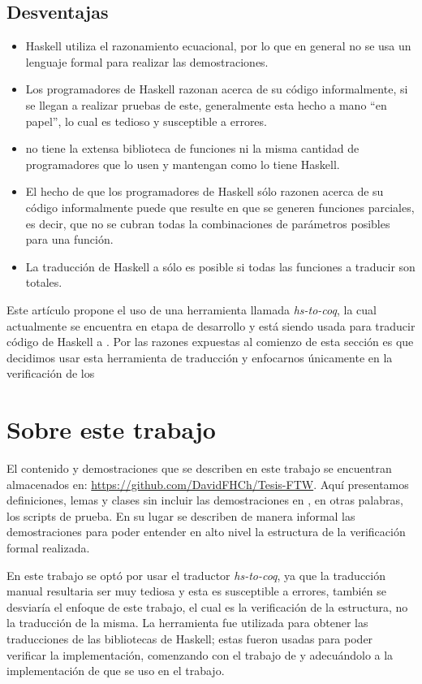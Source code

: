 \subsection{Desventajas}
\begin{itemize}
    \item Haskell utiliza el razonamiento ecuacional, por lo que en general no se usa un lenguaje formal para realizar las demostraciones.
    \item Los programadores de Haskell razonan acerca de su código informalmente, si se llegan a
    realizar pruebas de este, generalmente esta hecho a mano ``en papel'', lo cual es tedioso y
    susceptible a errores.
    \item {\coq} no tiene la extensa biblioteca de funciones ni la misma cantidad de programadores
    que lo usen y mantengan como lo tiene Haskell.
    \item El hecho de que los programadores de Haskell s\'olo razonen acerca de su código
    informalmente puede que resulte en que se generen funciones parciales, es decir, que no se
    cubran todas la combinaciones de parámetros posibles para una funci\'on.
    \item La traducci\'on de Haskell a {\coq} s\'olo es posible si todas las funciones a traducir son
    totales.
\end{itemize}

Este art\'iculo propone el uso de una herramienta llamada \textit{hs-to-coq}, la cual actualmente se
encuentra en etapa de desarrollo y est\'a siendo usada para traducir código de Haskell a {\coq}. Por las razones expuestas al comienzo de esta secci\'on es que decidimos usar esta herramienta de traducci\'on y enfocarnos \'unicamente en la verificaci\'on de los \arns

\section{Sobre este trabajo}
El contenido y demostraciones que se describen en este trabajo se encuentran almacenados en:
\url{https://github.com/DavidFHCh/Tesis-FTW}. Aqu\'i presentamos definiciones, lemas y clases sin
incluir las demostraciones en {\coq}, en otras palabras, los scripts de prueba. En su lugar se describen de manera informal las demostraciones para poder entender en alto nivel la estructura de la verificaci\'on formal realizada.

En este trabajo se opt\'o por usar el traductor \textit{hs-to-coq}, ya que la traducci\'on manual
resultaria ser muy tediosa y esta es susceptible a errores, tambi\'en se desviaría el enfoque de
este trabajo, el cual es la verificaci\'on de la estructura, no la traducci\'on de la misma. La
herramienta fue utilizada para obtener las traducciones de las bibliotecas de Haskell; estas fueron
usadas para poder verificar la implementación, comenzando con el trabajo de \cite{tesisG} y adecuándolo a la implementaci\'on de 
\cite{MSetRBT} que se uso en el trabajo.

